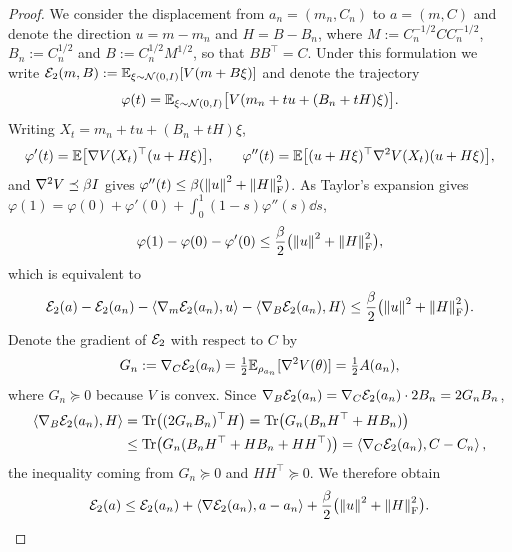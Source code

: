 \begin{proof}
    We consider the displacement from $a_n=(m_n,C_n)$ to $a=(m,C)$ and denote the direction
    $u=m-m_n$ and $H=B-B_n$, where $M:=C_n^{-1/2}CC_n^{-1/2}$, $B_n:=C_n^{1/2}$ and
    $B:=C_n^{1/2}M^{1/2}$, so that $BB^\top=C$. Under this formulation we write
    $\mathcal{E}_2(m,B):=\mathbb{E}_{\xi\sim\mathcal{N}(0,I)}[V(m+B\xi)]$ and denote the trajectory
    \begin{equation*}
        \varphi(t)=\mathbb{E}_{\xi\sim\mathcal{N}(0,I)}\bigl[V(m_n+tu+(B_n+tH)\xi)\bigr].
    \end{equation*}
    Writing $X_t=m_n+tu+(B_n+tH)\xi$,
    \begin{equation*}
        \varphi'(t)=\mathbb{E}\bigl[\nabla V(X_t)^\top(u+H\xi)\bigr],
        \qquad
        \varphi''(t)=\mathbb{E}\bigl[(u+H\xi)^\top\nabla^2V(X_t)(u+H\xi)\bigr],
    \end{equation*}
    and $\nabla^2V\preceq\beta I$ gives $\varphi''(t)\leq\beta(\left\lVert u\right\rVert^2+\left\lVert H\right\rVert_{\mathrm{F}}^2)$. As
    Taylor's expansion gives $\varphi(1)=\varphi(0)+\varphi'(0)+\int_0^1(1-s)\varphi''(s)\dd s$,
    \begin{equation*}
        \varphi(1)-\varphi(0)-\varphi'(0)\leq\frac\beta2\bigl(\left\lVert u\right\rVert^2+\left\lVert H\right\rVert_{\mathrm{F}}^2\bigr),
    \end{equation*}
    which is equivalent to
    \begin{equation*}
        \mathcal{E}_2(a)-\mathcal{E}_2(a_n)
        -\left\langle \nabla_m\mathcal{E}_2(a_n),u\right\rangle
        -\left\langle \nabla_B\mathcal{E}_2(a_n),H\right\rangle
        \leq\frac\beta2\bigl(\left\lVert u\right\rVert^2+\left\lVert H\right\rVert_{\mathrm{F}}^2\bigr).
    \end{equation*}
    Denote the gradient of $\mathcal{E}_2$ with respect to $C$ by
    \begin{equation*}
        G_n:=\nabla_C\mathcal{E}_2(a_n)=\tfrac12\mathbb{E}_{\rho_{a_n}}[\nabla^2V(\theta)]=\tfrac12A(a_n),
    \end{equation*}
    where $G_n\succeq0$ because $V$ is convex. Since
    $\nabla_B\mathcal{E}_2(a_n)=\nabla_C\mathcal{E}_2(a_n)\cdot2B_n=2G_nB_n$,
    \begin{align*}
        \left\langle \nabla_B\mathcal{E}_2(a_n),H\right\rangle
        &=\operatorname{Tr}\bigl((2G_nB_n)^\top H\bigr)=\operatorname{Tr}\bigl(G_n(B_nH^\top+HB_n)\bigr)\\
        &\leq\operatorname{Tr}\bigl(G_n(B_nH^\top+HB_n+HH^\top)\bigr)
        =\left\langle \nabla_C\mathcal{E}_2(a_n),C-C_n\right\rangle,
    \end{align*}
    the inequality coming from $G_n\succeq0$ and $HH^\top\succeq0$. We therefore obtain
    \begin{equation*}
        \mathcal{E}_2(a)
        \leq\mathcal{E}_2(a_n)+\left\langle \nabla\mathcal{E}_2(a_n),a-a_n\right\rangle
        +\frac\beta2\bigl(\left\lVert u\right\rVert^2+\left\lVert H\right\rVert_{\mathrm{F}}^2\bigr).
    \end{equation*}


\end{proof}
